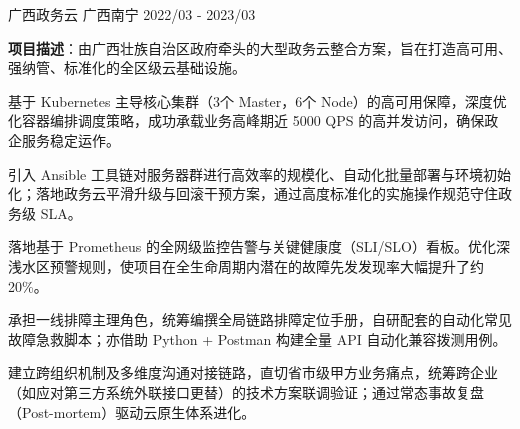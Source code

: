 \begin{cventries}
  \cventry
    {} %
    {广西政务云} %
    {广西南宁} %
    {2022/03 - 2023/03} %
    {
      \begin{cvitems} %
        \item {\textbf{项目描述}：由广西壮族自治区政府牵头的大型政务云整合方案，旨在打造高可用、强纳管、标准化的全区级云基础设施。}
        \item {基于 Kubernetes 主导核心集群（3个 Master，6个 Node）的高可用保障，深度优化容器编排调度策略，成功承载业务高峰期近 5000 QPS 的高并发访问，确保政企服务稳定运作。}
        \item {引入 Ansible 工具链对服务器群进行高效率的规模化、自动化批量部署与环境初始化；落地政务云平滑升级与回滚干预方案，通过高度标准化的实施操作规范守住政务级 SLA。}
        \item {落地基于 Prometheus 的全网级监控告警与关键健康度（SLI/SLO）看板。优化深浅水区预警规则，使项目在全生命周期内潜在的故障先发发现率大幅提升了约 20\%。}
        \item {承担一线排障主理角色，统筹编撰全局链路排障定位手册，自研配套的自动化常见故障急救脚本；亦借助 Python + Postman 构建全量 API 自动化兼容拨测用例。}
        \item {建立跨组织机制及多维度沟通对接链路，直切省市级甲方业务痛点，统筹跨企业（如应对第三方系统外联接口更替）的技术方案联调验证；通过常态事故复盘（Post-mortem）驱动云原生体系进化。}
      \end{cvitems}
    }


\end{cventries}
